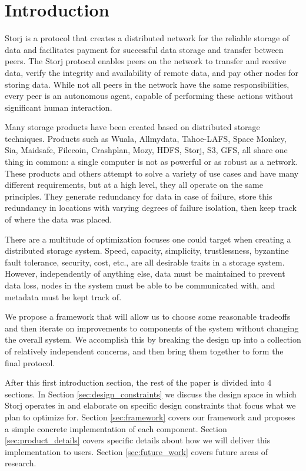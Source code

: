 \documentclass[a4paper,10pt]{article} \usepackage[utf8]{inputenc}
\begin{document}
\section{Introduction}

Storj is a protocol that creates a distributed network for the reliable storage
of data and facilitates payment for successful data storage and transfer
between peers.
The Storj protocol enables peers on the network to transfer and receive data,
verify the integrity and availability of remote data, and pay other nodes
for storing data.
While not all peers in the network have the same responsibilities,
every peer is an autonomous agent, capable of performing these actions without
significant human interaction.

Many storage products have been created based on distributed storage techniques.
Products such as Wuala, Allmydata, Tahoe-LAFS, Space Monkey, Sia, Maidsafe,
Filecoin, Crashplan, Mozy, HDFS, Storj, S3, GFS, all share one thing in common:
a single computer is not as powerful or as robust as a network. These products
and others attempt to solve a variety of use cases and have many different
requirements, but at a high level, they all operate on the same principles. They
generate redundancy for data in case of failure, store this redundancy in
locations with varying degrees of failure isolation, then keep track of where
the data was placed.

There are a multitude of optimization focuses one could target when creating a
distributed storage system. Speed, capacity, simplicity, trustlessness,
byzantine fault tolerance, security, cost, etc., are all desirable traits in a
storage system. However, independently of anything else, data must be maintained to
prevent data loss, nodes in the system must be able to be communicated with, and
metadata must be kept track of.

We propose a framework that will allow us to choose some reasonable tradeoffs
and then iterate on improvements to components of the system without changing
the overall system.
We accomplish this by breaking the design up into a collection
of relatively independent concerns, and then bring them together to form the
final protocol.

After this first introduction section, the rest of the paper is divided into 4
sections. In Section \ref{sec:design_constraints} we discuss the design space
in which Storj operates in and elaborate on specific design constraints that
focus what we plan to optimize for.
Section \ref{sec:framework} covers our framework and proposes a simple
concrete implementation of each component.
Section \ref{sec:product_details} covers specific details
about how we will deliver this implementation to users. Section
\ref{sec:future_work} covers future areas of research.
\end{document}
